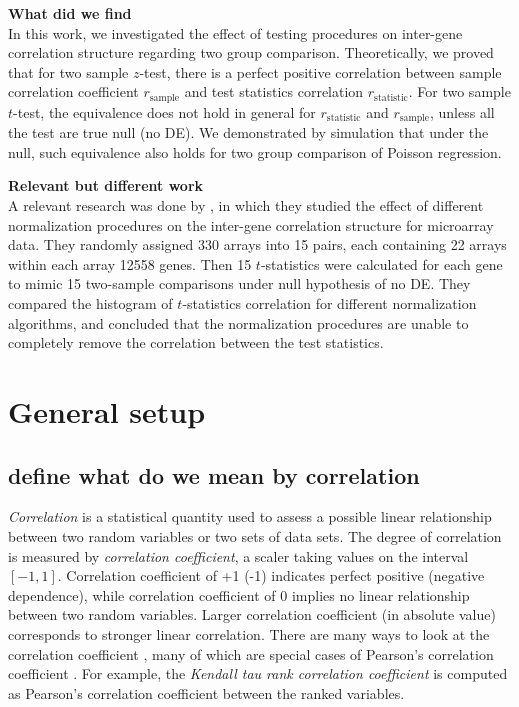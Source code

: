 \documentclass[12pt, a4paper]{article}
\begin{document}
	
		\textbf{What did we find}\\
		In this work, we investigated the effect of testing procedures on inter-gene correlation structure
		regarding two group comparison. Theoretically, we proved that for two sample $z$-test, there is a
		perfect positive correlation between sample correlation coefficient $r_{\text{sample}}$ and test
		statistics correlation $r_{\text{statistic}}$. For two sample $t$-test, the equivalence does not
		hold in general for $r_{\text{statistic}}$ and $r_{\text{sample}}$, unless all the test are true
		null (no DE).  We demonstrated by simulation that under the null, such equivalence also holds for
		two group comparison of Poisson regression. 
		
		
	
	\textbf{Relevant but different work}\\
	A relevant research was done by \citet{qiu2005effects}, in which they studied the effect of different
	normalization procedures on the inter-gene correlation structure for microarray data. They randomly
	assigned 330 arrays into 15 pairs, each containing 22 arrays within each array 12558 genes. Then 15
	$t$-statistics were calculated for each gene to mimic 15 two-sample comparisons under null
	hypothesis of no DE. They compared the histogram of $t$-statistics correlation for different
	normalization algorithms, and concluded that the normalization procedures are unable to completely
	remove the correlation between the test statistics. %
	

	
	
	
	
	
	\section{General setup}
	
	\subsection{define what do we mean by correlation}
	\textit{Correlation} is a statistical quantity used to assess a possible linear relationship between two random variables or two sets of data sets. The degree of correlation is measured by \textit{correlation coefficient}, a scaler taking values on the interval $[-1, 1]$. Correlation coefficient of +1 (-1) indicates perfect positive (negative dependence), while correlation coefficient of 0 implies no linear relationship between two random variables. Larger correlation coefficient (in absolute value) corresponds to stronger linear correlation. 
	There are many ways to look at the correlation coefficient , many of which are special cases of Pearson's correlation coefficient \citep{lee1988thirteen}. For example, the \textit{Kendall tau rank correlation coefficient} is computed as Pearson's correlation coefficient between the ranked variables.
	
\end{document}
